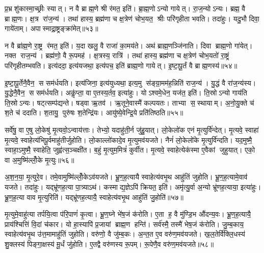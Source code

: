 प्र॒भ्रशु॑कास्मा॒च्छ्रीः स्यात्।
न वै ब्राह्म॒णे श्री र॑मत॒ इति॑।
ब्रा॒ह्म॒णोऽन्यो गायेत्।
रा॒ज॒न्योऽन्यः।
ब्रह्म॒ वै ब्राह्म॒णः।
क्ष॒त्र रा॑ज॒न्य॑।
तथा॑ हास्य॒ ब्रह्म॑णा च क्ष॒त्रेण॑ चोभ॒यत॒ श्रीः परि॑गृहीता भवति।
तदा॑हुः।
यदु॒भौ दिवा॒ गाये॑ताम्।
अपास्माद्रा॒ष्ट्रङ्क्रा॑मेत्॥५३॥

न वै ब्रा॑ह्म॒णे रा॒ष्ट्र र॑मत॒ इति॑।
य॒दा खलु॒ वै राजा॑ का॒मय॑ते।
अथ॑ ब्राह्म॒णञ्जि॑नाति।
दिवा ब्राह्म॒णो गा॑येत्।
नक्त राज॒न्य॑।
ब्रह्म॑णो॒ वै रू॒पमह॑।
क्ष॒त्रस्य॒ रात्रि॑।
तथा॑ हास्य॒ ब्रह्म॑णा च क्ष॒त्रेण॑ चोभ॒यतो॑ रा॒ष्ट्रं परि॑गृहीतम्भवति।
इत्य॑ददा॒ इत्य॑यजथा॒ इत्य॑पच॒ इति॑ ब्राह्म॒णो गायेत्।
इ॒ष्टा॒पू॒र्तं वै ब्राह्म॒णस्य॑॥५४॥

इ॒ष्टा॒पू॒र्तेनै॒वैन॒ स सम॑र्धयति।
इत्य॑जिना॒ इत्य॑युध्यथा॒ इत्य॒मु स॑ङ्ग्रा॒मम॑ह॒न्निति॑ राज॒न्य॑।
यु॒द्धं वै रा॑ज॒न्य॑स्य।
यु॒द्धेनै॒वैन॒ स सम॑र्धयति।
अकॢ॑प्ता॒ वा ए॒तस्य॒र्तव॒ इत्या॑हुः।
योऽश्वमे॒धेन॒ यज॑त॒ इति॑।
ति॒स्रोऽन्यो गाय॑ति ति॒स्रोऽन्यः।
षट्त्सम्प॑द्यन्ते।
षड्वा ऋ॒तव॑।
ऋ॒तूने॒वास्मै॑ कल्पयतः।
ताभ्या स॒स्थायाम्।
अ॒नो॒यु॒क्ते च॑ श॒ते च॑ ददाति।
श॒तायु॒ पुरु॑षः श॒तेन्द्रि॑यः।
आयु॑ष्ये॒वेन्द्रि॒ये प्रति॑तिष्ठति॥५५॥\anuvakamend[गाये॑ताङ्क्रामेद्ब्राह्म॒णस्य॑ कल्पयतश्च॒त्वारि॑ च]

सर्वे॑षु॒ वा ए॒षु लो॒केषु॑ मृ॒त्यवो॒ऽन्वाय॑त्ताः।
तेभ्यो॒ यदाहु॑ती॒र्न जु॑हु॒यात्।
लो॒केलो॑क एनं मृ॒त्युर्वि॑न्देत्।
मृ॒त्यवे॒ स्वाहा॑ मृ॒त्यवे॒ स्वाहेत्य॑भिपू॒र्वमाहु॑तीर्जुहोति।
लो॒काल्लो॑कादे॒व मृ॒त्युमव॑यजते।
नैनं॑ लो॒केलो॑के मृ॒त्युर्वि॑न्दति।
यद॒मुष्मै॒ स्वाहा॒ऽमुष्मै॒ स्वाहेति॒ जुह्व॑त्स॒ञ्चक्षी॑त।
ब॒हुं मृ॒त्युम॒मित्रं॑ कुर्वीत।
मृ॒त्यवे॒ स्वाहेत्येक॑स्मा ए॒वैकां जुहुयात्।
एको॒ वा अ॒मुष्मि॑ल्लोँ॒के मृ॒त्युः॥५६॥

अ॒श॒न॒या॒ मृ॒त्युरे॒व।
तमे॒वामुष्मि॑ल्लोँ॒केऽव॑यजते।
भ्रू॒ण॒ह॒त्यायै स्वाहेत्य॑वभृ॒थ आहु॑तिं जुहोति।
भ्रू॒ण॒ह॒त्यामे॒वाव॑ यजते।
तदा॑हुः।
यद्भ्रू॑णह॒त्या पा॒त्र्याऽथ॑।
कस्माद्य॒ज्ञेऽपि॑ क्रियत॒ इति॑।
अमृ॑त्यु॒र्वा अ॒न्यो भ्रू॑णह॒त्याया॒ इत्या॑हुः।
भ्रू॒ण॒ह॒त्या वाव मृ॒त्युरिति॑।
यद्भ्रू॑णह॒त्यायै॒ स्वाहेत्य॑वभृ॒थ आहु॑तिं जु॒होति॑॥५७॥

मृ॒त्युमे॒वाहु॑त्या तर्पयि॒त्वा प॑रि॒पाणं॑ कृ॒त्वा।
भ्रू॒ण॒घ्ने भे॑ष॒जं क॑रोति।
ए॒ता ह॒ वै मु॑ण्डि॒भ औ॑दन्य॒वः।
भ्रू॒ण॒ह॒त्यायै॒ प्राय॑श्चित्तिं वि॒दां च॑कार।
यो हा॒स्यापि॑ प्र॒जायां ब्राह्म॒ण हन्ति॑।
सर्व॑स्मै॒ तस्मै॑ भेष॒जं क॑रोति।
जु॒म्ब॒काय॒ स्वाहेत्य॑वभृ॒थ उ॑त्त॒मामाहु॑तिं जुहोति।
वरु॑णो॒ वै जु॑म्ब॒कः।
अ॒न्त॒त ए॒व वरु॑ण॒मव॑यजते।
ख॒ल॒तेर्वि॑क्लि॒धस्य॑ शु॒क्लस्य॑ पिङ्गा॒क्षस्य॑ मू॒र्धं जु॑होति।
ए॒तद्वै वरु॑णस्य रू॒पम्।
रू॒पेणै॒व वरु॑ण॒मव॑यजते॥५८॥\anuvakamend[लो॒के मृ॒त्युर्जु॒होति॑ मू॒र्धं जु॑होति॒ द्वे च॑]

